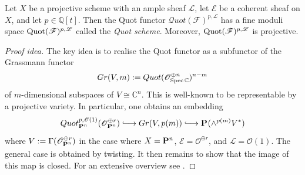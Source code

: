 \documentclass[12pt]{ociamthesis}  %
\begin{document}
\begin{theorem}
  Let $X$ be a projective scheme with an ample sheaf $\mathscr L$,
  let $\mathscr E$ be a coherent sheaf on $X$, and let
  $p\in\mathbb{Q}[t]$. Then the Quot functor
  $\mathcal Quot(\mathscr F)^{p,\mathscr L}$ has a fine moduli space
  $\operatorname{Quot}(\mathscr F)^{p,\mathscr L}$ called the \emph{Quot scheme}.
  Moreover, $\operatorname{Quot}(\mathscr F)^{p,\mathscr L}$ is projective.
  \begin{proof}[Proof idea]
    The key idea is to realise the Quot functor as a subfunctor
    of the Grassmann functor
    \begin{align*}
      Gr(V,m) := Quot(\mathscr O^{\oplus n}_{\operatorname{Spec}\mathbb C})^{n-m}
    \end{align*}
    of $m$-dimensional subspaces of $V\cong\mathbb C^n$. This is
    well-known to be representable by a projective variety.
    \cite[Proposition 8.14]{gortz2010}
    In particular, one obtains an embedding
    \begin{align}\label{eq:quot_embedding}
      Quot^{p,\mathscr O(1)}_{\projective{n}{}}(\mathscr O^{\oplus r}_{\projective{n}{}})
      \longinc Gr(V,p(m))
      \longinc \projective{}{}(\wedge^{p(m)}V^*)
    \end{align}
    where $V := \Gamma(\mathscr O^{\oplus r}_{\mathbf{P}^{n}_{}})$
    in the case where $X=\mathbf{P}^{n}_{}$, $\mathscr E=\mathscr O^{\oplus r}$,
    and $\mathscr L=\mathscr O(1)$. The general case is obtained by
    twisting.
    It then remains to show that the image of this map is closed.
    For an extensive overview see \cite[70-73]{hoskins2016}.
  \end{proof}
\end{theorem}
\end{document}
